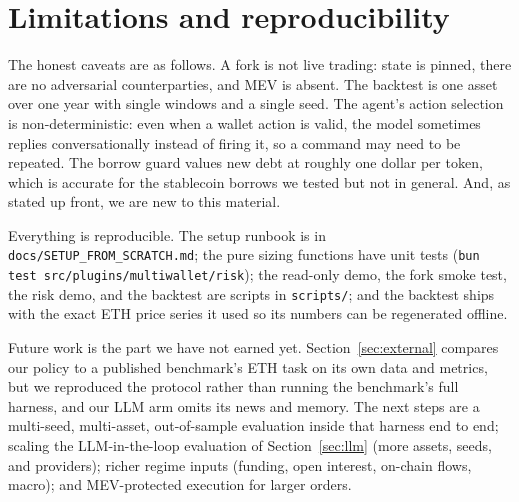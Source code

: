 \documentclass[11pt]{article}
\newcommand{\code}[1]{\texttt{#1}}
\begin{document}
\section{Limitations and reproducibility}\label{sec:limits}
The honest caveats are as follows. A fork is not live trading: state is pinned, there are no
adversarial counterparties, and MEV is absent. The backtest is one asset over one year with single
windows and a single seed. The agent's action selection is non-deterministic: even when a wallet
action is valid, the model sometimes replies conversationally instead of firing it, so a command may
need to be repeated. The borrow guard values new debt at roughly one dollar per token, which is
accurate for the stablecoin borrows we tested but not in general. And, as stated up front, we are
new to this material.

Everything is reproducible. The setup runbook is in \code{docs/SETUP\_FROM\_SCRATCH.md}; the pure
sizing functions have unit tests (\code{bun test src/plugins/multiwallet/risk}); the read-only demo,
the fork smoke test, the risk demo, and the backtest are scripts in \code{scripts/}; and the backtest
ships with the exact ETH price series it used so its numbers can be regenerated offline.

Future work is the part we have not earned yet. Section~\ref{sec:external} compares our policy to a
published benchmark's ETH task on its own data and metrics, but we reproduced the protocol rather than
running the benchmark's full harness, and our LLM arm omits its news and memory. The next steps are a
multi-seed, multi-asset, out-of-sample evaluation inside that harness end to end; scaling the
LLM-in-the-loop evaluation of Section~\ref{sec:llm} (more assets, seeds, and providers); richer
regime inputs (funding, open interest, on-chain flows, macro); and MEV-protected execution for larger
orders.
\end{document}
